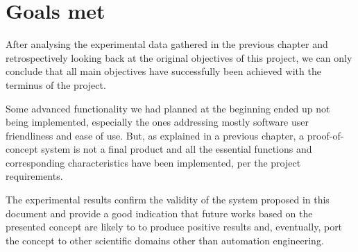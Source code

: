 \section{Goals met} \label{sec:goals-met}
After analysing the experimental data gathered in the previous chapter and retrospectively looking back at the original objectives of this project, we can only conclude that all main objectives have successfully been achieved with the terminus of the project.

Some advanced functionality we had planned at the beginning ended up not being implemented, especially the ones addressing mostly software user friendliness and ease of use.
But, as explained in a previous chapter, a proof-of-concept system is not a final product and all the essential functions and corresponding characteristics have been implemented, per the project requirements.

The experimental results confirm the validity of the system proposed in this document and provide a good indication that future works based on the presented concept are likely to to produce positive results and, eventually, port the concept to other scientific domains other than automation engineering.
